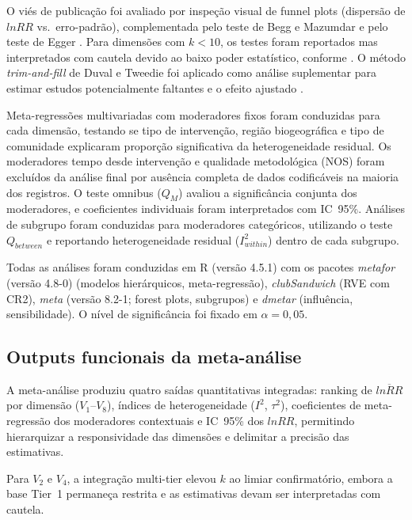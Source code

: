 O viés de publicação foi avaliado por inspeção visual de funnel plots (dispersão de $lnRR$ vs.\ erro-padrão), complementada pelo teste de Begg e Mazumdar \cite{Begg1994} e pelo teste de Egger \cite{Sterne2005}. Para dimensões com $k < 10$, os testes foram reportados mas interpretados com cautela devido ao baixo poder estatístico, conforme . O método \textit{trim-and-fill} de Duval e Tweedie foi aplicado como análise suplementar para estimar estudos potencialmente faltantes e o efeito ajustado \cite{Duval2000}.

Meta-regressões multivariadas com moderadores fixos foram conduzidas para cada dimensão, testando se tipo de intervenção, região biogeográfica e tipo de comunidade explicaram proporção significativa da heterogeneidade residual. Os moderadores tempo desde intervenção e qualidade metodológica (NOS) foram excluídos da análise final por ausência completa de dados codificáveis na maioria dos registros. O teste omnibus ($Q_M$) avaliou a significância conjunta dos moderadores, e coeficientes individuais foram interpretados com IC~95\%. Análises de subgrupo foram conduzidas para moderadores categóricos, utilizando o teste $Q_{between}$ e reportando heterogeneidade residual ($I^2_{within}$) dentro de cada subgrupo.

Todas as análises foram conduzidas em R (versão 4.5.1) com os pacotes \textit{metafor} (versão 4.8-0) \cite{Viechtbauer2010} (modelos hierárquicos, meta-regressão), \textit{clubSandwich} \cite{Pustejovsky2022} (RVE com CR2), \textit{meta} (versão 8.2-1; forest plots, subgrupos) e \textit{dmetar} (influência, sensibilidade). O nível de significância foi fixado em $\alpha = 0{,}05$.

\subsection{Outputs funcionais da meta-análise}
\label{sec:outputs_cap2}

A meta-análise produziu quatro saídas quantitativas integradas: ranking de $\overline{lnRR}$ por dimensão ($V_1$--$V_8$), índices de heterogeneidade ($I^2$, $\tau^2$), coeficientes de meta-regressão dos moderadores contextuais e IC~95\% dos $lnRR$, permitindo hierarquizar a responsividade das dimensões e delimitar a precisão das estimativas.

Para $V_2$ e $V_4$, a integração multi-tier elevou $k$ ao limiar confirmatório, embora a base Tier~1 permaneça restrita e as estimativas devam ser interpretadas com cautela.

